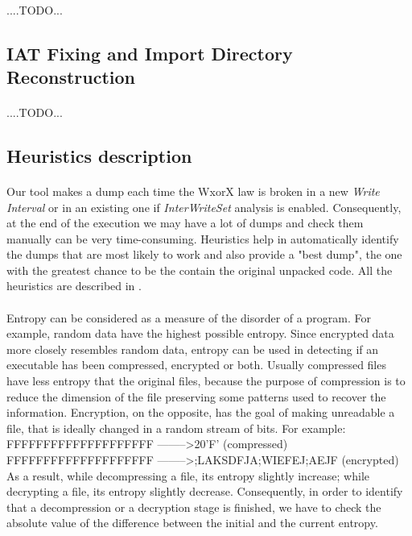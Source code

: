 \paragraph{}
....TODO...

\subsection{IAT Fixing and Import Directory Reconstruction}
\paragraph{}
....TODO...


\subsection{Heuristics description}
\paragraph{}
Our tool makes a dump each time the \ac{WxorX} law is broken in a new \textit{Write Interval} or in an existing one if \textit{InterWriteSet} analysis is enabled. Consequently, at the end of the execution we may have a lot of dumps and check them manually can be very time-consuming. Heuristics help in automatically identify the dumps that are most likely to work and also provide a "best dump", the one with the greatest chance to be the contain the original unpacked code. All the heuristics are described in \cite{Practical_Malware_Analysis}.
\paragraph{}
Entropy can be considered as a measure of the disorder of a program. For example, random data have the highest possible entropy. Since encrypted data more closely resembles random data, entropy can be used in detecting if an executable has been compressed, encrypted or both. Usually compressed files have less entropy that the original files, because the purpose of compression is to reduce the dimension of the file preserving some patterns used to recover the information. Encryption, on the opposite, has the goal of making unreadable a file, that is ideally changed in a random stream of bits. For example:\\
FFFFFFFFFFFFFFFFFFFF --------\textgreater 20'F' (compressed)\\
FFFFFFFFFFFFFFFFFFFF --------\textgreater ;LAKSDFJA;WIEFEJ;AEJF (encrypted)\\
As a result, while decompressing a file, its entropy slightly increase; while decrypting a file, its entropy slightly decrease. Consequently, in order to identify that a decompression or a decryption stage is finished, we have to check the absolute value of the difference between the initial and the current entropy.
